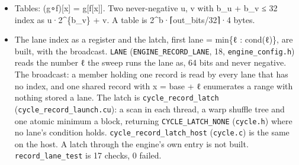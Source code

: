 \begin{itemize}
\begin{itemize}
\item key = P(δ), δ the impulse. For linear shift-invariant P, P(x) = key ∗ x.
\item w·x = Σ over the set bits b of w of x ≪ b.
\item With lanes wide enough that none carries, A·K holds the smoothed lanes, and K = K\_\allowbreak{}z·K\_\allowbreak{}y·K\_\allowbreak{}x.
\item A lane below 2\textasciicircum{}m under a row of sum S stays below 2\textasciicircum{}\{m + bitlen(S − 1)\}.
\item The CRC-64 key: the advance over 2\textasciicircum{}k zero bytes is A\textasciicircum{}\{2\textasciicircum{}k\}, 48 matrices (24,576 bytes), and crc(a ⊕ b) = crc(a) ⊕ crc(b) ⊕ crc(0).
\item The mirror fold repeats with period 2N: one period is laid as a table of offsets.
\end{itemize}
\item Tables: (g∘f)[x] = g[f[x]]. Two never-negative u, v with b\_\allowbreak{}u + b\_\allowbreak{}v ≤ 32 index as u·2\textasciicircum{}\{b\_\allowbreak{}v\} + v. A table is 2\textasciicircum{}b·⌈out\_\allowbreak{}bits/32⌉·4 bytes.
\item The lane index as a register and the latch, first lane = min\{ℓ : cond(ℓ)\}, are built, with the broadcast. \texttt{LANE} (\texttt{ENGINE\_\allowbreak{}RECORD\_\allowbreak{}LANE}, 18, \texttt{engine\_\allowbreak{}config.\allowbreak{}h}) reads the number ℓ the sweep runs the lane as, 64 bits and never negative. The broadcast: a member holding one record is read by every lane that has no index, and one shared record with x = base + ℓ enumerates a range with nothing stored a lane. The latch is \texttt{cycle\_\allowbreak{}record\_\allowbreak{}latch} (\texttt{cycle\_\allowbreak{}record\_\allowbreak{}launch.\allowbreak{}cu}): a scan in each thread, a warp shuffle tree and one atomic minimum a block, returning \texttt{CYCLE\_\allowbreak{}LATCH\_\allowbreak{}NONE} (\texttt{cycle.\allowbreak{}h}) where no lane's condition holds. \texttt{cycle\_\allowbreak{}record\_\allowbreak{}latch\_\allowbreak{}host} (\texttt{cycle.\allowbreak{}c}) is the same on the host. A latch through the engine's own entry is not built. \texttt{record\_\allowbreak{}lane\_\allowbreak{}test} is 17 checks, 0 failed.

\end{itemize}
